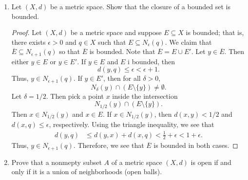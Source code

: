 \documentclass[a4paper]{article}
\begin{document}
\begin{enumerate}
\begin{proof}
        With (2), suppose \( x \in A  \). We want to show that \( x \in \overline{E} \); that is, \( x  \) is either a limit point of \( E  \) or an element of \( E  \). Suppose that \( x  \) is NOT an element of \( E  \). By definition of \( A  \), we see that for all \( \epsilon > 0 \), 
        \[  {N}_{\epsilon}(x) \cap E \neq \emptyset.  \]
        Note that \( x \notin E  \) implies that \( E \setminus \{ x \} = E    \) and so we have 
        \[  {N}_{\epsilon}(x) \cap E \setminus  \{ x \} \neq \emptyset. \]
        Thus, \( x  \) is a limit point of \( E  \) and so \( x \in \overline{E} \). Otherwise, when \( x  \) is not a limit point of \( E  \), then the nonempty intersection
        \[  {N}_{\epsilon}(x) \cap E  \]
        implies that \( x \in E  \) and so \( x \in \overline{E} \). Thus, \( A \subseteq \overline{E} \).
    \end{proof}
\item Let \( (X,d) \) be a metric space. Show that the closure of a bounded set is bounded.
    \begin{proof}
        Let \( (X,d) \) be a metric space and suppose \( E \subseteq X \) is bounded; that is, there exists \( \epsilon > 0  \) and \( q \in X  \) such that \( E \subseteq {N}_{\epsilon}(q)  \). We claim that \( \overline{E} \subseteq {N}_{\epsilon + 1}(q) \) so that \( \overline{E} \) is bounded. Note that \( \overline{E } = E \cup E' \). Let \( y \in \overline{E} \). Then either \( y \in E  \) or \( y \in E' \). If \( y \in E  \) and \( E  \) i bounded, then   
        \[  d(y,q) \leq \epsilon < \epsilon + 1.  \]
        Thus, \( y \in {N}_{\epsilon + 1 }(q) \). If \( y \in E' \), then for all \( \delta > 0  \),
        \[  {N}_{\delta}(y) \cap (E \setminus  \{ y \} ) \neq \emptyset. \]
        Let \( \delta = 1/2 \). Then pick a point \( x  \) inside the intersection 
        \[  {N}_{1/2}(y) \cap (E \setminus  \{ y \} ).    \]
        Then \( x \in {N}_{1/2}(y) \) and \( x \in E  \). If \( x \in {N}_{1/2}(y) \), then \( d(x,y) < 1/2  \) and \( d(x,q) \leq \epsilon  \), respectively. Using the triangle inequality, we see that 
        \begin{align*}
            d(y,q) &\leq d(y,x) + d(x,q)
                   < \frac{ 1 }{ 2 }  + \epsilon 
                   < 1 + \epsilon.
        \end{align*}
        Thus, \( y \in {N}_{\epsilon + 1}(q) \). Therefore, we see that \( \overline{E} \) is bounded in both cases.
    \end{proof}
\item Prove that a nonmepty subset \( A  \) of a metric space \( (X,d) \) is open if and only if it is a union of neighborhoods (open balls).

\end{enumerate}
\end{document}
